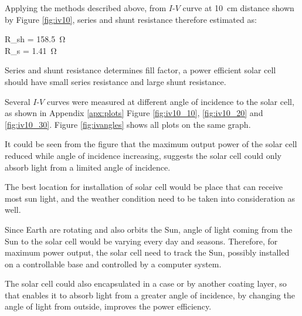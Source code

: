 \begin{Content}
Applying the methods described above, from $I$-$V$ curve at \SI{10}{\centi\metre} distance shown by Figure \ref{fig:iv10}, series and shunt resistance therefore estimated as:
\begin{Gather}
	R_{sh} =  \approx {} \approx \SI{158.5}{\ohm}
	\label{eq:rsh} \\
	R_s =  \approx {} \approx \SI{1.41}{\ohm}
	\label{eq:rs}
\end{Gather}

Series and shunt resistance determines fill factor, a power efficient solar cell should have small series resistance and large shunt resistance.


Several $I$-$V$ curves were measured at different angle of incidence to the solar cell, as shown in Appendix \ref{apx:plots} Figure \ref{fig:iv10_10}, \ref{fig:iv10_20} and \ref{fig:iv10_30}. Figure \ref{fig:ivangles} shows all plots on the same graph.
\begin{Figure}
	\ivplotangles
	\caption{\ivlncap}
	\label{fig:ivangles}
\end{Figure}

It could be seen from the figure that the maximum output power of the solar cell reduced while angle of incidence increasing, suggests the solar cell could only absorb light from a limited angle of incidence.


The best location for installation of solar cell would be place that can receive most sun light, and the weather condition need to be taken into consideration as well.
\Par

Since Earth are rotating and also orbits the Sun, angle of light coming from the Sun to the solar cell would be varying every day and seasons. Therefore, for maximum power output, the solar cell need to track the Sun, possibly installed on a controllable base and controlled by a computer system.
\Par

The solar cell could also encapsulated in a case or by another coating layer, so that enables it to absorb light from a greater angle of incidence, by changing the angle of light from outside, improves the power efficiency.


\end{Content}
